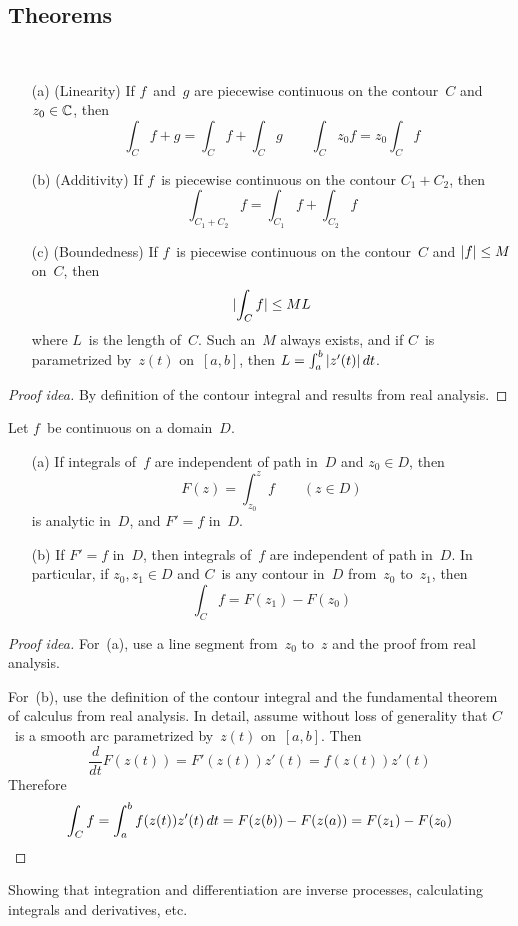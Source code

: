 \subsection*{Theorems}
\begin{thm}
\ 
\begin{enumerate}[itemsep=0pt]
\item[(a)] (Linearity) If \(f\)~and~\(g\) are piecewise continuous on the contour~\(C\) and \(z_0\in\mathbb{C}\), then
\[\int_C f+g=\int_C f+\int_C g\qquad\int_C z_0 f=z_0\int_C f\]
\item[(b)] (Additivity) If \(f\)~is piecewise continuous on the contour \(C_1+C_2\), then
\[\int_{C_1+C_2}f=\int_{C_1}f+\int_{C_2}f\]
\item[(c)] (Boundedness) If \(f\)~is piecewise continuous on the contour~\(C\) and \(|{f}|\le M\) on~\(C\), then
\[|{\int_C f}|\le ML\]
where \(L\)~is the length of~\(C\). Such an~\(M\) always exists, and if \(C\)~is parametrized by~\(z(t)\) on~\([a,b]\), then \(L=\int_a^b|{z'(t)}|\,dt\).
\end{enumerate}
\end{thm}
\begin{proof}[Proof idea]
By definition of the contour integral and results from real analysis.
\end{proof}

\begin{thm}
Let \(f\)~be continuous on a domain~\(D\).
\begin{enumerate}[itemsep=0pt]
\item[(a)] If integrals of~\(f\) are independent of path in~\(D\) and \(z_0\in D\), then
\[F(z)=\int_{z_0}^z f\qquad(z\in D)\]
is analytic in~\(D\), and \(F'=f\) in~\(D\).
\item[(b)] If \(F'=f\) in~\(D\), then integrals of~\(f\) are independent of path in~\(D\). In particular, if \(z_0,z_1\in D\) and \(C\)~is any contour in~\(D\) from~\(z_0\) to~\(z_1\), then
\[\int_C f=F(z_1)-F(z_0)\]
\end{enumerate}
\end{thm}
\begin{proof}[Proof idea]
For~(a), use a line segment from~\(z_0\) to~\(z\) and the proof from real analysis.

For~(b), use the definition of the contour integral and the fundamental theorem of calculus from real analysis. In detail, assume without loss of generality that \(C\)~is a smooth arc parametrized by~\(z(t)\) on~\([a,b]\). Then
\[\frac{d}{dt}F(z(t))=F'(z(t))z'(t)=f(z(t))z'(t)\]
Therefore
\begin{equation*}
\int_C f=\int_a^b f(z(t))z'(t)\,dt=F(z(b))-F(z(a))=F(z_1)-F(z_0)\qedhere
\end{equation*}
\end{proof}
\begin{app}
Showing that integration and differentiation are inverse processes, calculating integrals and derivatives, etc.
\end{app}

